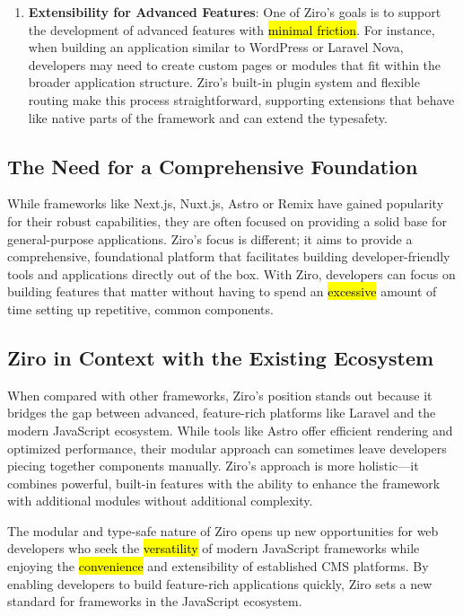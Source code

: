 \begin{enumerate}
	\item \textbf{Extensibility for Advanced Features}: One of Ziro’s goals is to support the development of advanced features with \hl{minimal friction}. For instance, when building an application similar to WordPress or Laravel Nova, developers may need to create custom pages or modules that fit within the broader application structure. Ziro’s built-in plugin system and flexible routing make this process straightforward, supporting extensions that behave like native parts of the framework and can extend the typesafety.
\end{enumerate}


\subsection*{The Need for a Comprehensive Foundation}
While frameworks like Next.js, Nuxt.js, Astro or Remix have gained popularity for their robust capabilities, they are often focused on providing a solid base for general-purpose applications. Ziro’s focus is different; it aims to provide a comprehensive, foundational platform that facilitates building developer-friendly tools and applications directly out of the box. With Ziro, developers can focus on building features that matter without having to spend an \hl{excessive} amount of time setting up repetitive, common components.

\subsection*{Ziro in Context with the Existing Ecosystem}
When compared with other frameworks, Ziro’s position stands out because it bridges the gap between advanced, feature-rich platforms like Laravel and the modern JavaScript ecosystem. While tools like Astro offer efficient rendering and optimized performance, their modular approach can sometimes leave developers piecing together components manually. Ziro’s approach is more holistic—it combines powerful, built-in features with the ability to enhance the framework with additional modules without additional complexity.

The modular and type-safe nature of Ziro opens up new opportunities for web developers who seek the \hl{versatility} of modern JavaScript frameworks while enjoying the \hl{convenience} and extensibility of established CMS platforms. By enabling developers to build feature-rich applications quickly, Ziro sets a new standard for frameworks in the JavaScript ecosystem.

